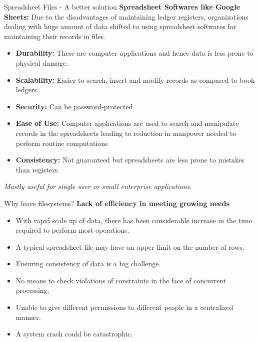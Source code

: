 \documentclass[aspectratio=169, xcolor=dvipsnames]{beamer}
\begin{document}
\begin{frame}{Spreadsheet Files - A better solution}
    \textbf{Spreadsheet Softwares like Google Sheets:} Due to the disadvantages of maintaining ledger registers, organizations dealing with huge amount of data shifted to using spreadsheet softwares for maintaining their records in files.
    \begin{itemize}[<+->]
        \item \textbf{Durability:} These are computer applications and hence data is less prone to physical damage.
        \item \textbf{Scalability:} Easier to search, insert and modify records as compared to book ledgers
        \item \textbf{Security:} Can be password-protected
        \item \textbf{Ease of Use:} Computer applications are used to search and manipulate records in the spreadsheets leading to reduction in manpower needed to perform routine computations
        \item \textbf{Consistency:} Not guaranteed but spreadsheets are less prone to mistakes than registers.
    \end{itemize}
    \vspace{0.5em}
    \textit{Mostly useful for single user or small enterprise applications.}
\end{frame}

\begin{frame}{Why leave filesystems?}
    \textbf{Lack of efficiency in meeting growing needs}
    \begin{itemize}[<+->]
        \item With rapid scale up of data, there has been considerable increase in the time required to perform most operations.
        \item A typical spreadsheet file may have an upper limit on the number of rows.
        \item Ensuring consistency of data is a big challenge.
        \item No means to check violations of constraints in the face of concurrent processing.
        \item Unable to give different permissions to different people in a centralized manner.
        \item A system crash could be catastrophic.
    \end{itemize}
    
\end{frame}
\end{document}

